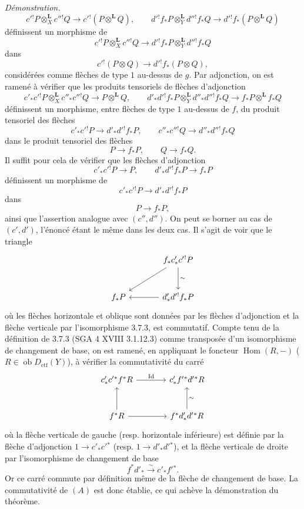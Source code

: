 \documentclass[11pt]{article}
\newenvironment{prooftext}[1][Proof]{\par\noindent\emph{#1.}\ }{\par\medskip}
\DeclareMathOperator{\Hom}{Hom}
\newcommand{\ob}{\operatorname{ob}}
\providecommand{\Dctf}{D_{\mathrm{ctf}}}
\providecommand{\Id}{\mathrm{Id}}
\providecommand{\lisom}{\xrightarrow{\sim}}
\providecommand{\Dctf}{D_{\mathrm{ctf}}}
\providecommand{\Hom}{\operatorname{Hom}}
\providecommand{\ob}{\operatorname{ob}}
\providecommand{\Hom}{\operatorname{Hom}}
\begin{document}
\begin{prooftext}[Démonstration]
\[
c'{}^!P\otimes_X^{\mathbf L}c''{}^!Q\longrightarrow c'{}^!(P\otimes^{\mathbf L}Q),\qquad
d'{}^!f_*P\otimes_Y^{\mathbf L}d''{}^!f_*Q\longrightarrow d'{}^!f_*(P\otimes^{\mathbf L}Q)
\]
définissent un morphisme de
\[
c'{}^!P\otimes_X^{\mathbf L}c''{}^!Q\longrightarrow d'{}^!f_*P\otimes_Y^{\mathbf L}d''{}^!f_*Q
\]
dans
\[
c'{}^!(P\otimes Q)\longrightarrow d'{}^!f_*(P\otimes Q),
\]
considérées comme flèches de type $1$ au-dessus de $g$. Par adjonction, on est ramené à vérifier que les produits tensoriels de flèches d'adjonction
\[
c'_*c'{}^!P\otimes_X^{\mathbf L}c''_*c''{}^!Q\longrightarrow P\otimes^{\mathbf L}Q,
\qquad
d'_*d'{}^!f_*P\otimes_Y^{\mathbf L}d''_*d''{}^!f_*Q
\longrightarrow f_*P\otimes^{\mathbf L}f_*Q
\]
définissent un morphisme, entre flèches de type $1$ au-dessus de $f$, du produit tensoriel des flèches
\[
c'_*c'{}^!P\longrightarrow d'_*d'{}^!f_*P,\qquad
c''_*c''{}^!Q\longrightarrow d''_*d''{}^!f_*Q
\]
dans le produit tensoriel des flèches
\[
P\longrightarrow f_*P,\qquad Q\longrightarrow f_*Q.
\]
Il suffit pour cela de vérifier que les flèches d'adjonction
\[
c'_*c'{}^!P\longrightarrow P,\qquad d'_*d'{}^!f_*P\longrightarrow f_*P
\]
définissent un morphisme de
\[
c'_*c'{}^!P\longrightarrow d'_*d'{}^!f_*P
\]
dans
\[
P\longrightarrow f_*P,
\]
ainsi que l'assertion analogue avec $(c'',d'')$. On peut se borner au cas de $(c',d')$, l'énoncé étant le même dans les deux cas. Il s'agit de voir que le triangle
\[
\begin{tikzcd}[column sep=large,row sep=large]
& f_*c'_*c'{}^!P \arrow[d,"\sim"]\arrow[dl]\\
f_*P & d'_*d'{}^!f_*P\arrow[l]
\end{tikzcd}
\]
où les flèches horizontale et oblique sont données par les flèches d'adjonction et la flèche verticale par l'isomorphisme 3.7.3, est commutatif. Compte tenu de la définition de 3.7.3 (SGA 4 XVIII 3.1.12.3) comme transposée d'un isomorphisme de changement de base, on est ramené, en appliquant le foncteur $\Hom(R,-)$ ($R\in\ob\Dctf(Y)$), à vérifier la commutativité du carré
\[
\begin{tikzcd}[column sep=large,row sep=large]
c'_*c'{}^*f^*R \arrow[r,"\Id"] &
c'_*f'{}^*d'{}^*R\\
f^*R \arrow[u] \arrow[r] &
f^*d'_*d'{}^*R\arrow[u,"\sim"']
\end{tikzcd}
\]
où la flèche verticale de gauche (resp. horizontale inférieure) est définie par la flèche d'adjonction $1\longrightarrow c'_*c'{}^*$ (resp. $1\longrightarrow d'_*d'{}^*$), et la flèche verticale de droite par l'isomorphisme de changement de base
\[
f^*d'_*\lisom c'_*f'{}^*.
\]
Or ce carré commute par définition même de la flèche de changement de base. La commutativité de $(A)$ est donc établie, ce qui achève la démonstration du théorème.
\end{prooftext}
\end{document}
